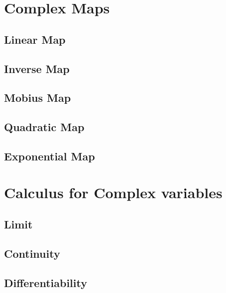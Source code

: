 \section{Complex Maps}

\subsection{Linear Map}

\subsection{Inverse Map}

\subsection{Mobius Map}

\subsection{Quadratic Map}

\subsection{Exponential Map}


\section{Calculus for Complex variables}

\subsection{Limit}

\subsection{Continuity}

\subsection{Differentiability}
